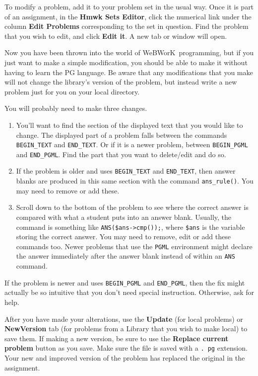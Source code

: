 \documentclass[12pt]{article}
\newcommand{\menu}[1]{\textbf{#1}}
\newcommand{\WW}{WeBWorK}
\newcommand{\HSE}{\menu{Hmwk Sets Editor}}
\begin{document}
To modify a problem, add it to your problem set in the usual way.
Once it is part of an assignment, in the \HSE, click the numerical link under the column \menu{Edit Problems} corresponding to the set in question.
Find the problem that you wish to edit, and click \menu{Edit it}.
A new tab or window will open.

Now you have been thrown into the world of \WW\ programming, but if you just want to make a simple modification, you should be able to make it without having to learn the PG language.
Be aware that any modifications that you make will not change the library's version of the problem, but instead write a new problem just for you on your local directory.

You will probably need to make three changes.
\begin{enumerate}
	\item You'll want to find the section of the displayed text that you would like to change.
	      The displayed part of a problem falls between the commands \verb=BEGIN_TEXT= and \verb=END_TEXT=.
	      Or if it is a newer problem, between  \verb=BEGIN_PGML= and \verb=END_PGML=.
	      Find the part that you want to delete/edit and do so.

	\item If the problem is older and uses \verb=BEGIN_TEXT= and \verb=END_TEXT=, then answer blanks are produced in this same section with the command \verb=ans_rule()=.
	      You may need to remove or add these.

	\item Scroll down to the bottom of the problem to see where the correct answer is compared with what a student puts into an answer blank.
	      Usually, the command is something like \verb=ANS($ans->cmp());=, where \verb=$ans= is the variable storing the correct answer.
	      You may need to remove, edit or add these commands too.
	      Newer problems that use the \texttt{PGML} environment might declare the answer immediately after the answer blank instead of within an \texttt{ANS} command.
\end{enumerate}
If the problem is newer and uses \verb=BEGIN_PGML= and \verb=END_PGML=, then the fix might actually be so intuitive that you don't need special instruction.
Otherwise, ask for help.

After you have made your alterations, use the \menu{Update} (for local problems) or \menu{NewVersion} tab (for problems from a Library that you wish to make local) to save them.
If making a new version, be sure to use the \menu{Replace current problem} button as you save.
Make sure the file is saved with a \texttt{.
	pg} extension.
Your new and improved version of the problem has replaced the original in the assignment.
\end{document}

